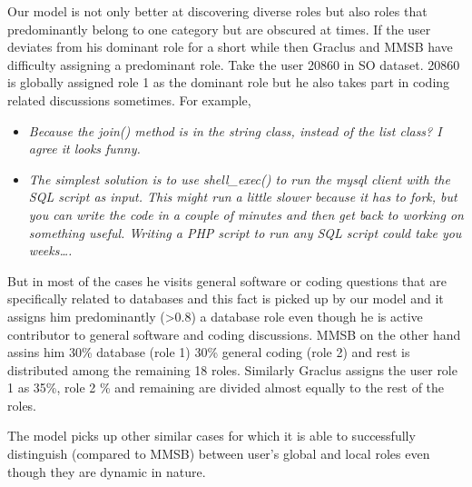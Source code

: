 \documentclass{sig-alternate}
\newcommand{\abhi}[1]{\textcolor{blue}{\\ abhi-comment: #1}}
\newcommand{\comment}[1]{\textcolor{red}{[#1]}}
\begin{document}
Our model is not only better at discovering diverse roles but also roles 
that predominantly belong to one category but are obscured at times. 
If the user deviates from his dominant role
for a short while then Graclus and MMSB have difficulty assigning
a predominant role. 
Take the user 20860 in SO dataset. 20860 is globally assigned 
role 1 as the dominant role but he also takes part in coding related 
discussions sometimes. For example, 
\small
\begin{itemize}
  \item \textit{Because the join() method is in 
the string class, instead of the list class?
I agree it looks funny.}  
\item \textit{The simplest solution is to use
shell\_exec() to run the mysql client with the SQL script as input. 
This might run a little slower because it has to fork, but you can write 
the code in a couple of minutes and then get back to working on something useful. 
Writing a PHP script to run any SQL script could take you weeks\ldots.}
\end{itemize}
\normalsize
But in most of the cases he visits general software or coding questions
that are specifically related to databases and this fact is picked up by our
model and it assigns him predominantly (>0.8) a database role even though he 
is active contributor to
general software and coding discussions. MMSB on the other hand assins him 30\%
database (role 1) 30\% general coding (role 2) and rest is distributed among the
remaining 18 roles. Similarly Graclus assigns the user role 1 as 35\%, role 2
\% and remaining are divided almost equally to the rest of the roles. 

The model picks up other similar cases for which it is able
to successfully distinguish (compared to MMSB) between user's global and local
roles even though they are dynamic in nature.


\vspace*{-0.5\baselineskip}
\end{document}
